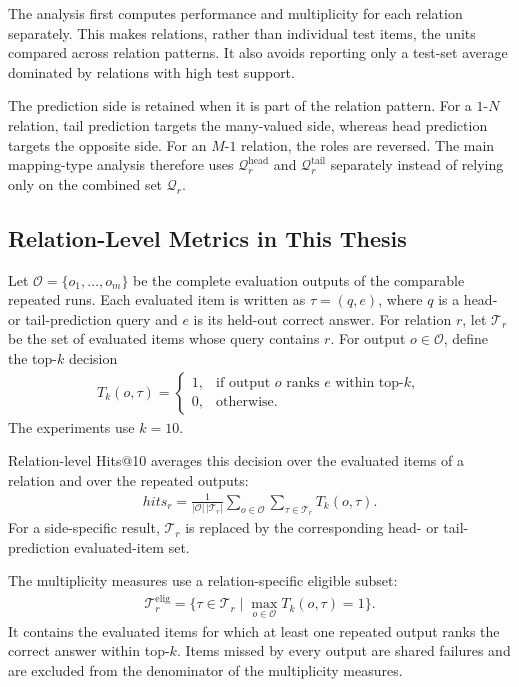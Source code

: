 The analysis first computes performance and multiplicity for each relation
separately. This makes relations, rather than individual test items, the units
compared across relation patterns. It also avoids reporting only a test-set
average dominated by relations with high test support.

The prediction side is retained when it is part of the relation pattern. For a
$1$-$N$ relation, tail prediction targets the many-valued side, whereas head
prediction targets the opposite side. For an $M$-$1$ relation, the roles are
reversed. The main mapping-type analysis therefore uses
$\mathcal{Q}^{\mathrm{head}}_r$ and $\mathcal{Q}^{\mathrm{tail}}_r$ separately
instead of relying only on the combined set $\mathcal{Q}_r$.

\subsection{Relation-Level Metrics in This Thesis}

Let $\mathcal{O}=\{o_1,\ldots,o_m\}$ be the complete evaluation outputs of the
comparable repeated runs. Each evaluated item is written as $\tau=(q,e)$,
where $q$ is a head- or tail-prediction query and $e$ is its held-out correct
answer. For relation $r$, let $\mathcal{T}_r$ be the set of evaluated items
whose query contains $r$. For output $o\in\mathcal{O}$, define the top-$k$
decision
\begin{align}
    T_k(o,\tau) =
    \begin{cases}
        1, & \text{if output } o \text{ ranks } e \text{ within top-}k,\\
        0, & \text{otherwise.}
    \end{cases}
\end{align}
The experiments use $k=10$.

Relation-level Hits@10 averages this decision over the evaluated items of a
relation and over the repeated outputs:
\begin{align}
    hits_r
    =
    \frac{1}{|\mathcal{O}|\,|\mathcal{T}_r|}
    \sum_{o\in\mathcal{O}}
    \sum_{\tau\in\mathcal{T}_r}
    T_k(o,\tau).
\end{align}
For a side-specific result, $\mathcal{T}_r$ is replaced by the corresponding
head- or tail-prediction evaluated-item set.

The multiplicity measures use a relation-specific eligible subset:
\begin{align}
    \mathcal{T}^{\mathrm{elig}}_r
    =
    \{\tau\in\mathcal{T}_r
    \mid \max_{o\in\mathcal{O}} T_k(o,\tau)=1\}.
\end{align}
It contains the evaluated items for which at least one repeated output ranks
the correct answer within top-$k$. Items missed by every output are shared
failures and are excluded from the denominator of the multiplicity measures.

